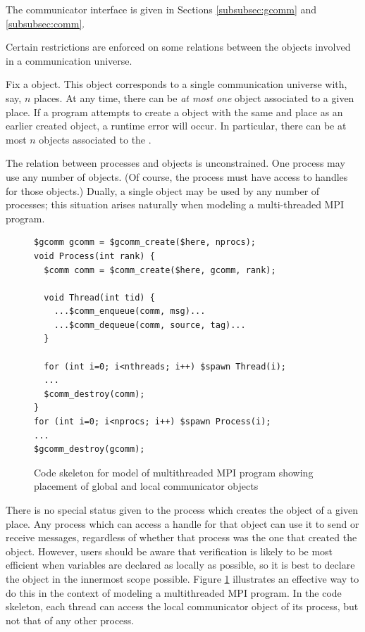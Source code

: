 The communicator interface is given in Sections \ref{subsubsec:gcomm} and  \ref{subsubsec:comm}.

Certain restrictions are enforced on some relations between the
objects involved in a communication universe.

Fix a \cgcomm{} object.  This object corresponds to a single
communication universe with, say, $n$ places.  At any time, there can
be \emph{at most one} \ccomm{} object associated to a given place.  If
a program attempts to create a \ccomm{} object with the same \cgcomm{}
and place as an earlier created \ccomm{} object, a runtime error will
occur.  In particular, there can be at most $n$ \ccomm{} objects
associated to the \cgcomm.

The relation between processes and \ccomm{} objects is unconstrained.
One process may use any number of \ccomm{} objects.  (Of course, the
process must have access to handles for those \ccomm{} objects.)
Dually, a single \ccomm{} object may be used by any number of
processes; this situation arises naturally when modeling a
multi-threaded MPI program.

\begin{figure}
  \begin{small}
\begin{verbatim}
$gcomm gcomm = $gcomm_create($here, nprocs);
void Process(int rank) {
  $comm comm = $comm_create($here, gcomm, rank);

  void Thread(int tid) {
    ...$comm_enqueue(comm, msg)...
    ...$comm_dequeue(comm, source, tag)...
  }

  for (int i=0; i<nthreads; i++) $spawn Thread(i);
  ...
  $comm_destroy(comm);
}
for (int i=0; i<nprocs; i++) $spawn Process(i);
...
$gcomm_destroy(gcomm);
\end{verbatim}
  \end{small}
  \caption{Code skeleton for model of multithreaded MPI program
    showing placement of global and local communicator objects}
  \label{fig:mpi-threads-comm}
\end{figure}

There is no special status given to the process which creates the
\ccomm{} object of a given place.  Any process which can access a
handle for that \ccomm{} object can use it to send or receive
messages, regardless of whether that process was the one that created
the \ccomm{} object.  However, users should be aware that verification
is likely to be most efficient when variables are declared as locally
as possible, so it is best to declare the \ccomm{} object in the
innermost scope possible.  Figure \ref{fig:mpi-threads-comm}
illustrates an effective way to do this in the context of modeling a
multithreaded MPI program.  In the code skeleton, each thread can
access the local communicator object of its process, but not that of
any other process.

